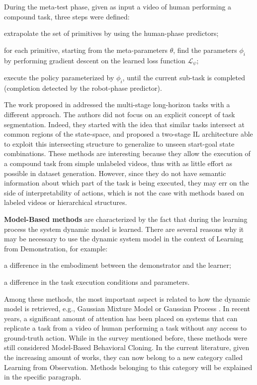\begin{enumerate*}[label=(\textbf{\arabic*})]
\end{enumerate*} During the meta-test phase, given as input a video of human performing a compound task, three steps were defined: \begin{enumerate*}[label=(\textbf{\arabic*})]
    \item extrapolate the set of primitives by using the human-phase predictors;
    \item for each primitive, starting from the meta-parameters $\theta$, find the parameters $\phi_{i}$ by performing gradient descent on the learned loss function $\mathcal{L}_{\psi}$;
    \item execute the policy parameterized by $\phi_{i}$, until the current sub-task is completed (completion detected by the robot-phase predictor).
\end{enumerate*} The work proposed in \cite{Mandlekar2020GTI} addressed the multi-stage long-horizon tasks with a different approach. The authors did not focus on an explicit concept of task segmentation. Indeed, they started with the idea that similar tasks intersect at common regions of the state-space, and proposed a two-stage IL architecture able to exploit this intersecting structure to generalize to unseen start-goal state combinations. 
\newline These methods are interesting because they allow the execution of a compound task from simple unlabeled videos, thus with as little effort as possible in dataset generation. However, since they do not have semantic information about which part of the task is being executed, they may err on the side of interpretability of actions, which is not the case with methods based on labeled videos or hierarchical structures.

\textbf{Model-Based methods} are characterized by the fact that during the learning process the system dynamic model is learned. There are several reasons why it may be necessary to use the dynamic system model in the context of Learning from Demonstration, for example: \begin{enumerate*}[label=\textbf{(\alph*)}]
    \item a difference in the embodiment between the demonstrator and the learner;
    \item a difference in the task execution conditions and parameters.
\end{enumerate*}
Among these methods, the most important aspect is related to how the dynamic model is retrieved, e.g., Gaussian Mixture Model \cite{grimes2009learning_actions_through_imitation} or Gaussian Process \cite{englert2013probabilistic,deisenroth2014multi_task}. In recent years, a significant amount of attention has been placed on systems that can replicate a task from a video of human performing a task without any access to ground-truth action. While in the survey mentioned before, these methods were still considered Model-Based Behavioral Cloning. In the current literature, given the increasing amount of works, they can now belong to a new category called Learning from Observation. Methods belonging to this category will be explained in the specific paragraph.  